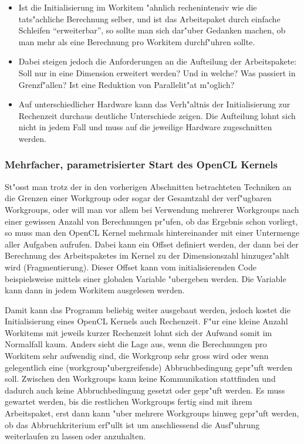 \begin{refsection}
\begin{itemize}
 \item Ist die Initialisierung im Workitem "ahnlich rechenintensiv wie die
       tats"achliche Berechnung selber, und ist das 
       Arbeitspaket durch einfache Schleifen ``erweiterbar'', so sollte man
       sich dar"uber Gedanken machen, ob man mehr als eine Berechnung
       pro Workitem durchf"uhren sollte.
 \item Dabei steigen jedoch die Anforderungen an die Aufteilung der Arbeitspakete:
       Soll nur in eine Dimension erweitert werden? Und in welche? Was 
       passiert in Grenzf"allen? Ist eine Reduktion von Parallelit"at m"oglich?
 \item Auf unterschiedlicher Hardware kann das Verh"altnis der Initialisierung zur
       Rechenzeit durchaus deutliche Unterschiede zeigen. Die Aufteilung
       lohnt sich nicht in jedem Fall und muss auf die jeweilige Hardware
       zugeschnitten werden.
\end{itemize}


\subsubsection{Mehrfacher, parametrisierter Start des OpenCL Kernels}

St"osst man trotz der in den vorherigen Abschnitten betrachteten Techniken an
die Grenzen einer Workgroup oder sogar der Gesamtzahl der verf"ugbaren
Workgroups, oder will man vor allem bei Verwendung mehrerer Workgroups nach
einer gewissen Anzahl von Berechnungen pr"ufen, ob das Ergebnis schon vorliegt,
so muss man den OpenCL Kernel mehrmals hintereinander mit einer Untermenge aller
Aufgaben aufrufen. Dabei kann ein Offset definiert
werden, der dann bei der Berechnung des Arbeitspaketes im Kernel zu der
Dimensionszahl hinzugez"ahlt wird (Fragmentierung).
Dieser Offset kann vom initialisierenden Code beispielsweise mittels einer globalen Variable
"ubergeben werden. Die Variable kann dann in jedem Workitem ausgelesen werden.

Damit kann das Programm
beliebig weiter ausgebaut werden, jedoch kostet die Initialisierung eines OpenCL
Kernels auch Rechenzeit. F"ur eine kleine Anzahl Workitems mit jeweils
kurzer Rechenzeit lohnt sich der Aufwand somit im Normalfall kaum.
Anders sieht die Lage aus, wenn die Berechnungen pro Workitem sehr aufwendig
sind, die Workgroup sehr gross wird oder wenn gelegentlich eine
(workgroup"ubergreifende) Abbruchbedingung gepr"uft werden soll. Zwischen den
Workgroups kann keine Kommunikation stattfinden und dadurch auch keine
Abbruchbedingung gesetzt oder gepr"uft werden. Es muss gewartet werden, bis die
restlichen Workgroups fertig sind mit ihrem Arbeitspaket, erst dann kann "uber
mehrere Workgroups hinweg gepr"uft werden, ob das Abbruchkriterium erf"ullt ist
um anschliessend die Ausf"uhrung weiterlaufen zu lassen oder anzuhalten.


\end{refsection}
